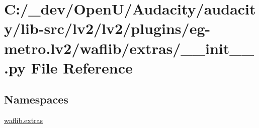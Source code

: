 \hypertarget{lv2_2lv2_2plugins_2eg-metro_8lv2_2waflib_2extras_2____init_____8py}{}\section{C\+:/\+\_\+dev/\+Open\+U/\+Audacity/audacity/lib-\/src/lv2/lv2/plugins/eg-\/metro.lv2/waflib/extras/\+\_\+\+\_\+init\+\_\+\+\_\+.py File Reference}
\label{lv2_2lv2_2plugins_2eg-metro_8lv2_2waflib_2extras_2____init_____8py}
\subsection*{Namespaces}
\begin{DoxyCompactItemize}
\item 
 \hyperlink{namespacewaflib_1_1extras}{waflib.\+extras}
\end{DoxyCompactItemize}
